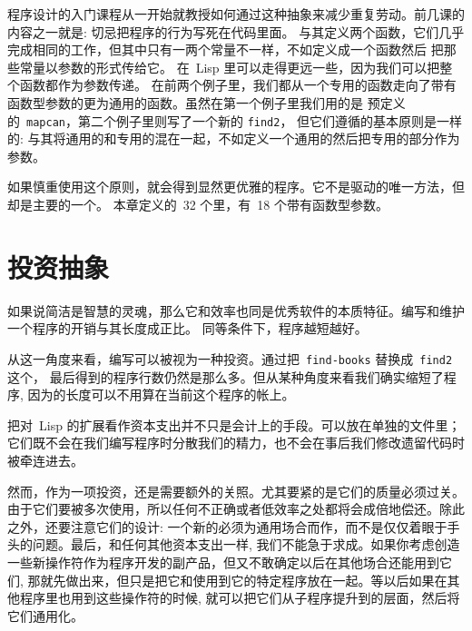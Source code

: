 程序设计的入门课程从一开始就教授如何通过这种抽象来减少重复劳动。前几课的内容之一就是: 
切忌把程序的行为写死在代码里面。
与其定义两个函数，它们几乎完成相同的工作，但其中只有一两个常量不一样，不如定义成一个函数然后
把那些常量以参数的形式传给它。
在~Lisp 里可以走得更远一些，因为我们可以把整个函数都作为参数传递。
在前两个例子里，我们都从一个专用的函数走向了带有函数型参数的更为通用的函数。虽然在第一个例子里我们用的是
预定义的~\texttt{mapcan}，第二个例子里则写了一个新的\utility{} \texttt{find2}，
但它们遵循的基本原则是一样的: 与其将通用的和专用的混在一起，不如定义一个通用的然后把专用的部分作为参数。

如果慎重使用这个原则，就会得到显然更优雅的程序。它不是驱动\bup{}的唯一方法，但却是主要的一个。
本章定义的~32 个\utility{}里，有~18 个带有函数型参数。

\section{投资抽象}
\label{sec:invest_in_abstraction}

如果说简洁是智慧的灵魂，那么它和效率也同是优秀软件的本质特征。编写和维护一个程序的开销与其长度成正比。
同等条件下，程序越短越好。

从这一角度来看，编写\utility{}可以被视为一种投资。通过把~\texttt{find-books} 替换成~\texttt{find2} 这个\utility{}，
最后得到的程序行数仍然是那么多。但从某种角度来看我们确实缩短了程序,
因为\utility{}的长度可以不用算在当前这个程序的帐上。

把对~Lisp 的扩展看作资本支出并不只是会计上的手段。\utility{}可以放在单独的文件里；
它们既不会在我们编写程序时分散我们的精力，也不会在事后我们修改遗留代码时被牵连进去。

然而，作为一项投资，\utility{}还是需要额外的关照。尤其要紧的是它们的质量必须过关。
由于它们要被多次使用，所以任何不正确或者低效率之处都将会成倍地偿还。除此之外，还要注意它们的设计:
一个新的\utility{}必须为通用场合而作，而不是仅仅着眼于手头的问题。最后，和任何其他资本支出一样,
我们不能急于求成。如果你考虑创造一些新操作符作为程序开发的副产品，但又不敢确定以后在其他场合还能用到它们,
那就先做出来，但只是把它和使用到它的特定程序放在一起。等以后如果在其他程序里也用到这些操作符的时候,
就可以把它们从子程序提升到\utility{}的层面，然后将它们通用化。

